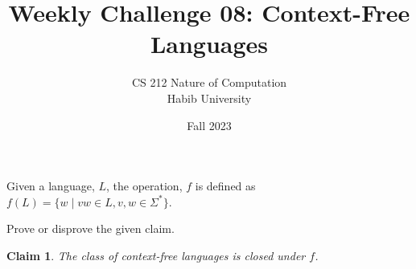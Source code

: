 \documentclass[a4paper]{exam}
\title{Weekly Challenge 08: Context-Free Languages}
\author{CS 212 Nature of Computation\\Habib University}
\date{Fall 2023}
\theoremstyle{theorem}
\theoremstyle{claim}
\newtheorem{claim}{Claim}
\begin{document}
\maketitle

\begin{questions}


  Given a language, $L$, the operation, $f$ is defined as $f(L) = \{w\mid vw \in L, v,w\in\Sigma^*\}$.

  Prove or disprove the given claim.

  \begin{claim}
    The class of context-free languages is closed under $f$.
  \end{claim}

  \begin{solution}
    
  \end{solution}
  
\end{questions}
\end{document}
